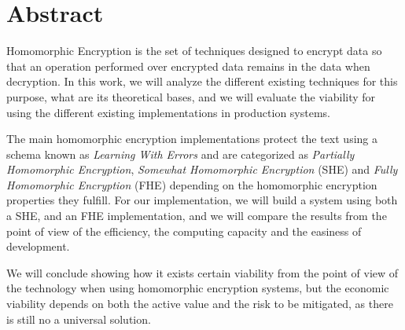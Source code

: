 \chapter*{Abstract}
\label{chap:abstract}

Homomorphic Encryption is the set of techniques designed to encrypt data so that an operation performed over encrypted data remains in the data when decryption. In this work, we will analyze the different existing techniques for this purpose, what are its theoretical bases, and we will evaluate the viability for using the different existing implementations in production systems.

The main homomorphic encryption implementations protect the text using a schema known as \textit{Learning With Errors} and are categorized as \textit{Partially Homomorphic Encryption}, \textit{Somewhat Homomorphic Encryption} (SHE) and \textit{Fully Homomorphic Encryption} (FHE) depending on the homomorphic encryption properties they fulfill. For our implementation, we will build a system using both a SHE, and an FHE implementation, and we will compare the results from the point of view of the efficiency, the computing capacity and the easiness of development.

We will conclude showing how it exists certain viability from the point of view of the technology when using homomorphic encryption systems, but the economic viability depends on both the active value and the risk to be mitigated, as there is still no a universal solution.
